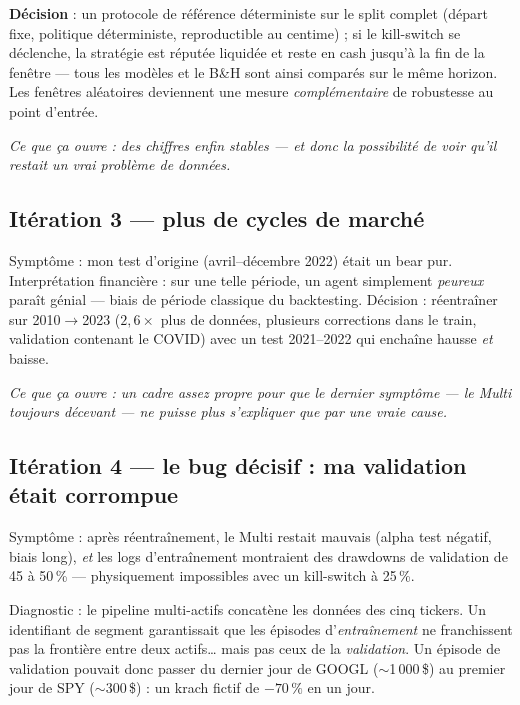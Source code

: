 \documentclass[11pt,a4paper]{article}
\newcommand{\ok}[1]{\textcolor{okgreen}{#1}}
\begin{document}
\textbf{Décision} : un protocole de référence \ok{déterministe sur le split complet}
(départ fixe, politique déterministe, reproductible au centime) ; si le kill-switch se
déclenche, la stratégie est réputée liquidée et \ok{reste en cash jusqu'à la fin de la
fenêtre} --- tous les modèles et le B\&H sont ainsi comparés sur le même horizon. Les
fenêtres aléatoires deviennent une mesure \emph{complémentaire} de robustesse au point
d'entrée.

\emph{Ce que ça ouvre : des chiffres enfin stables --- et donc la possibilité de voir
qu'il restait un vrai problème de données.}

\subsection{Itération 3 --- plus de cycles de marché}

Symptôme : mon test d'origine (avril--décembre 2022) était un bear pur. Interprétation
financière : sur une telle période, un agent simplement \emph{peureux} paraît génial ---
biais de période classique du backtesting. Décision : réentraîner sur 2010$\to$2023
($2{,}6\times$ plus de données, plusieurs corrections dans le train, validation
contenant le COVID) avec un test 2021--2022 qui enchaîne hausse \emph{et} baisse.

\emph{Ce que ça ouvre : un cadre assez propre pour que le dernier symptôme --- le Multi
toujours décevant --- ne puisse plus s'expliquer que par une vraie cause.}

\subsection{Itération 4 --- le bug décisif : ma validation était corrompue}
\label{sec:bug}

Symptôme : après réentraînement, le Multi restait mauvais (alpha test négatif, biais
long), \emph{et} les logs d'entraînement montraient des drawdowns de validation de 45 à
50\,\% --- physiquement impossibles avec un kill-switch à 25\,\%.

Diagnostic : le pipeline multi-actifs concatène les données des cinq tickers. Un
identifiant de segment garantissait que les épisodes d'\emph{entraînement} ne
franchissent pas la frontière entre deux actifs\ldots{} mais pas ceux de la
\emph{validation}. Un épisode de validation pouvait donc passer du dernier jour de
GOOGL ($\sim$1\,000\,\$) au premier jour de SPY ($\sim$300\,\$) : un krach fictif de
$-70\,\%$ en un jour.
\end{document}
